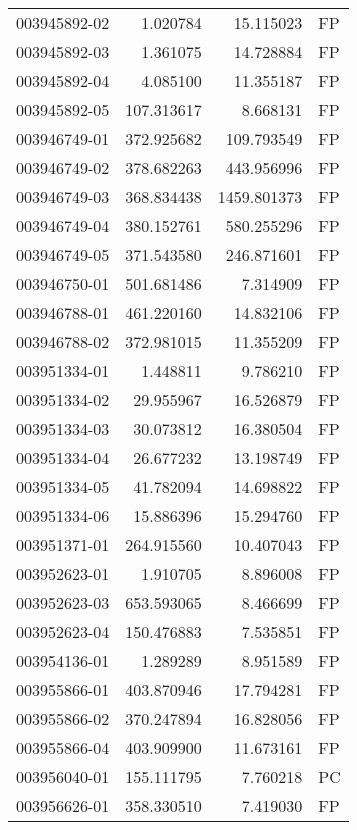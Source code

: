 \begin{tabular}{lrrl}
003945892-02 &    1.020784 &      15.115023 &   FP \\
003945892-03 &    1.361075 &      14.728884 &   FP \\
003945892-04 &    4.085100 &      11.355187 &   FP \\
003945892-05 &  107.313617 &       8.668131 &   FP \\
003946749-01 &  372.925682 &     109.793549 &   FP \\
003946749-02 &  378.682263 &     443.956996 &   FP \\
003946749-03 &  368.834438 &    1459.801373 &   FP \\
003946749-04 &  380.152761 &     580.255296 &   FP \\
003946749-05 &  371.543580 &     246.871601 &   FP \\
003946750-01 &  501.681486 &       7.314909 &   FP \\
003946788-01 &  461.220160 &      14.832106 &   FP \\
003946788-02 &  372.981015 &      11.355209 &   FP \\
003951334-01 &    1.448811 &       9.786210 &   FP \\
003951334-02 &   29.955967 &      16.526879 &   FP \\
003951334-03 &   30.073812 &      16.380504 &   FP \\
003951334-04 &   26.677232 &      13.198749 &   FP \\
003951334-05 &   41.782094 &      14.698822 &   FP \\
003951334-06 &   15.886396 &      15.294760 &   FP \\
003951371-01 &  264.915560 &      10.407043 &   FP \\
003952623-01 &    1.910705 &       8.896008 &   FP \\
003952623-03 &  653.593065 &       8.466699 &   FP \\
003952623-04 &  150.476883 &       7.535851 &   FP \\
003954136-01 &    1.289289 &       8.951589 &   FP \\
003955866-01 &  403.870946 &      17.794281 &   FP \\
003955866-02 &  370.247894 &      16.828056 &   FP \\
003955866-04 &  403.909900 &      11.673161 &   FP \\
003956040-01 &  155.111795 &       7.760218 &   PC \\
003956626-01 &  358.330510 &       7.419030 &   FP \\

\end{tabular}
